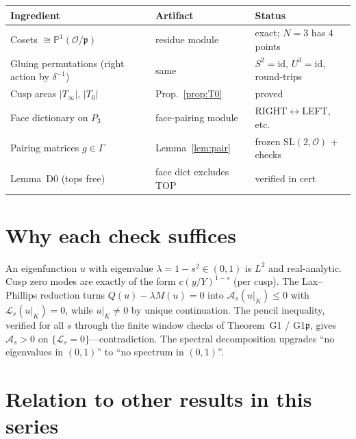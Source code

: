 \documentclass[11pt]{amsart}
\newcommand{\p}{\mathfrak{p}}
\begin{document}
\begin{center}
\begin{tabular}{@{}lll@{}}
\toprule
Ingredient & Artifact & Status \\
\midrule
Cosets $\cong\mathbb{P}^1(\mathcal{O}/\p)$
  & residue module & exact; $N=3$ has $4$ points \\
Gluing permutations (right action by $\delta^{-1}$)
  & same & $S^2=\mathrm{id}$, $U^3=\mathrm{id}$, round-trips \\
Cusp areas $|T_\infty|$, $|T_0|$
  & Prop.~\ref{prop:T0} & proved \\
Face dictionary on $P_3$
  & face-pairing module & RIGHT$\leftrightarrow$LEFT, etc. \\
Pairing matrices $g\in\Gamma$
  & Lemma~\ref{lem:pair} & frozen SL$(2,\mathcal{O})$ + checks \\
Lemma~D0 (tops free)
  & face dict excludes TOP & verified in cert \\
\bottomrule
\end{tabular}
\end{center}

\section{Why each check suffices}

An eigenfunction $u$ with eigenvalue $\lambda=1-s^2\in(0,1)$ is $L^2$ and
real-analytic.  Cusp zero modes are exactly of the form $c(y/Y)^{1-s}$
(per cusp).  The Lax--Phillips reduction turns $Q(u)-\lambda M(u)=0$ into
$\mathcal{A}_s(u|_K)\le 0$ with $\mathcal{L}_s(u|_K)=0$, while
$u|_K\neq 0$ by unique continuation.  The pencil inequality, verified for
all $s$ through the finite window checks of Theorem~G1 / G1$\p$, gives
$\mathcal{A}_s>0$ on $\{\mathcal{L}_s=0\}$---contradiction.  The spectral
decomposition upgrades ``no eigenvalues in $(0,1)$'' to ``no spectrum in
$(0,1)$''.

\section{Relation to other results in this series}
\end{document}
